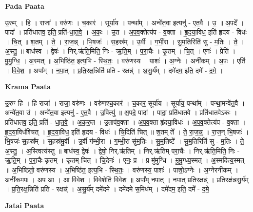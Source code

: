 \documentclass[17pt]{extarticle}
\begin{document}
\textbf{Pada Paata} \newline

उ॒रुम् । हि । राजा᳚ । वरु॑णः । च॒कार॑ । सूर्या॑य । पन्था᳚म् । अन्वे॑त॒वा इत्यनु॑ - ए॒त॒वै । उ॒ ॥ अ॒पदे᳚ । पादा᳚ । प्रति॑धातव॒ इति॒ प्रति॑-धा॒त॒वे॒ । अ॒कः॒ । उ॒त । अ॒प॒व॒क्तेत्य॑प - व॒क्ता । हृ॒द॒या॒विध॒ इति॑ हृदय - विधः॑ । चि॒त् ॥ श॒तम् । ते॒ । रा॒ज॒न्न् । भि॒षजः॑ । स॒हस्र᳚म् । उ॒र्वी । ग॒भीं॒रा । सु॒म॒तिरिति॑ सु - म॒तिः । ते॒ । अ॒स्तु॒ ॥ बाध॑स्व । द्वेषः॑ । निर्.ऋ॑ति॒मिति॒ निः - ऋ॒ति॒म् । प॒रा॒चैः । कृ॒तम् । चि॒त् । एनः॑ । प्रेति॑ । मु॒मु॒ग्धि॒ । अ॒स्मत् ॥ अ॒भिष्ठि॑त॒ इत्य॒भि - स्थि॒तः॒ । वरु॑णस्य । पाशः॑ । अ॒ग्नेः । अनी॑कम् । अ॒पः । एति॑ । वि॒वे॒श॒ ॥ अपा᳚म् । न॒पा॒त् । प्र॒ति॒रक्ष॒न्निति॑ प्रति - रक्षन्न्॑ । अ॒सु॒र्य᳚म् । दमे॑दम॒ इति॒ दमे᳚ - द॒मे॒ ।  \newline


\textbf{Krama Paata} \newline

उ॒रुꣳ हि । हि राजा᳚ । राजा॒ वरु॑णः । वरु॑णश्च॒कार॑ । च॒कार॒ सूर्या॑य । सूर्या॑य॒ पन्था᳚म् । पन्था॒मन्वे॑त॒वै । अन्वे॑त॒वा उ॑ । अन्वे॑त॒वा इत्यनु॑ - ए॒त॒वै । उ॒वित्यु॑ ॥ अ॒पदे॒ पादा᳚ । पादा॒ प्रति॑धातवे । प्रति॑धातवेऽकः । प्रति॑धातव॒ इति॒ प्रति॑ - धा॒त॒वे॒ । अ॒क॒रु॒त । उ॒ताप॑व॒क्ता । अ॒प॒व॒क्ता हृ॑दया॒विधः॑ । अ॒प॒व॒क्तेत्य॑प - व॒क्ता । हृ॒द॒या॒विध॑श्चित् । हृ॒द॒या॒विध॒ इति॑ हृदय - विधः॑ । चि॒दिति॑ चित् ॥ श॒तम् ते᳚ । ते॒ रा॒ज॒न्न्॒ । रा॒ज॒न् भि॒षजः॑ । भि॒षजः॑ स॒हस्र᳚म् । स॒हस्र॑मु॒र्वी । उ॒र्वी ग॑म्भी॒रा । ग॒म्भी॒रा सु॑म॒तिः । सु॒म॒तिष्टे᳚ । सु॒म॒तिरिति॑ सु - म॒तिः । ते॒ अ॒स्तु॒ । अ॒स्त्वित्य॑स्तु ॥ बाध॑स्व॒ द्वेषः॑ । द्वेषो॒ निर्.ऋ॑तिम् । निर्.ऋ॑तिम् परा॒चैः । निर्.ऋ॑ति॒मिति॒ निः - ऋ॒ति॒म् । प॒रा॒चैः कृ॒तम् । कृ॒तम् चि॑त् । चि॒देनः॑ । एनः॒ प्र । प्र मु॑मुग्धि । मु॒मु॒ग्ध्य॒स्मत् । अ॒स्मदित्य॒स्मत् ॥ अ॒भिष्ठि॑तो॒ वरु॑णस्य । अ॒भिष्ठि॑त॒ इत्य॒भि - स्थि॒तः॒ । वरु॑णस्य॒ पाशः॑ । पाशो॒ऽग्नेः । अ॒ग्नेरनी॑कम् । अनी॑कम॒पः । अ॒प आ । आ वि॑वेश । वि॒वे॒शेति॑ विवेश ॥ अपा᳚म् नपात् । न॒पा॒त् प्र॒ति॒रक्षन्न्॑ । प्र॒ति॒रक्ष॑न्नसु॒र्य᳚म् । प्र॒ति॒रक्ष॒न्निति॑ प्रति - रक्षन्न्॑ । अ॒सु॒र्य॑म् दमे॑दमे । दमे॑दमे स॒मिध᳚म् । दमे॑दम॒ इति॒ दमे᳚ - द॒मे॒ \newline

\textbf{Jatai Paata} \newline
\end{document}
